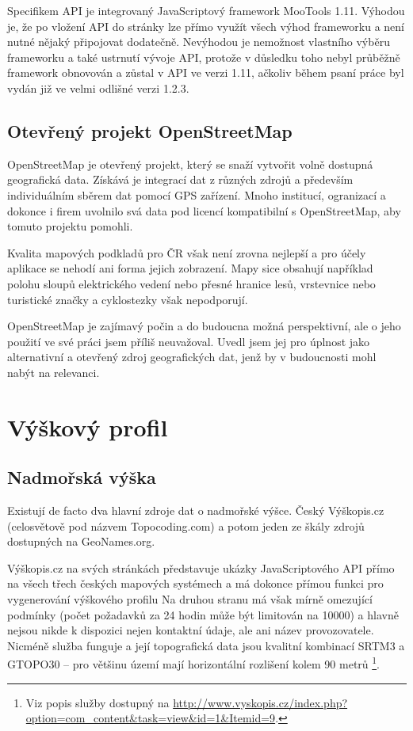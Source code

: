 Specifikem API je integrovaný JavaScriptový framework MooTools 1.11.
Výhodou je, že po vložení API do stránky lze přímo využít všech výhod
frameworku a není nutné nějaký připojovat dodatečně. Nevýhodou je
nemožnost vlastního výběru frameworku a také ustrnutí vývoje API,
protože v důsledku toho nebyl průběžně framework obnovován a zůstal
v API ve verzi 1.11, ačkoliv během psaní práce byl vydán již ve
velmi odlišné verzi 1.2.3.

\subsection{Otevřený projekt OpenStreetMap}
OpenStreetMap je otevřený projekt, který se snaží vytvořit volně
dostupná geografická data. Získává je integrací dat z různých zdrojů
a především individuálním sběrem dat pomocí GPS zařízení. Mnoho
institucí, ogranizací a dokonce i firem uvolnilo svá data pod licencí
kompatibilní s OpenStreetMap, aby tomuto projektu pomohli.

Kvalita mapových podkladů pro ČR však není zrovna nej\-lepší a
pro účely aplikace se nehodí ani forma jejich zobrazení. Mapy sice
obsahují například polohu sloupů elektrického vedení nebo přesné
hranice lesů, vrstevnice nebo turistické značky a cyklostezky však
nepodporují.

OpenStreetMap je zajímavý počin a do budoucna možná perspektivní, ale
o jeho použití ve své práci jsem příliš neuvažoval. Uvedl jsem jej
pro úplnost jako alternativní a otevřený zdroj geografických dat,
jenž by v budoucnosti mohl nabýt na relevanci.

\section{Výškový profil}\label{vyskovyProfil}
\subsection{Nadmořská výška}\label{vyskopis}
Existují de facto dva hlavní zdroje dat o nadmořské výšce.
Český Výškopis.cz (celosvětově pod názvem Topocoding.com) a potom
jeden ze škály zdrojů dostupných na GeoNames.org.

Výškopis.cz na svých stránkách představuje ukázky JavaScriptového API
přímo na všech třech českých mapových systémech a má dokonce přímou funkci pro
vygenerování výškového profilu Na druhou stranu má však mírně
omezující podmínky (počet požadavků za 24 hodin může být
limitován na 10000) a hlavně nejsou nikde k dispozici nejen kontaktní
údaje, ale ani název provozovatele. Nicméně služba funguje a
její topografická data jsou kvalitní kombinací SRTM3 a GTOPO30 -- pro
většinu území mají horizontální rozlišení kolem 90 metrů
\footnote{Viz popis služby dostupný na
\url{http://www.vyskopis.cz/index.php?option=com_content&task=view&id=1&Itemid=9}.}.

